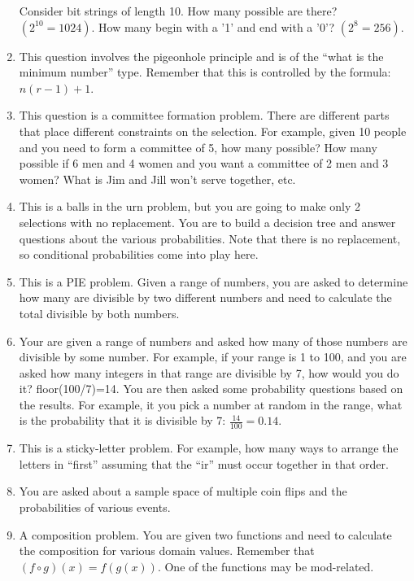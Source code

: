 \documentclass[letterpaper,12pt,fleqn]{article}
\begin{document}
\begin{enumerate}[left=0in]
  Consider bit strings of length 10.  How many possible are there?  \((2^{10}=1024)\).  How many begin with a '1'
  and end with a '0'?  \((2^8=256)\).

\item This question involves the pigeonhole principle and is of the ``what is the minimum number'' type.  Remember
  that this is controlled by the formula: \(n(r-1)+1\).

\item This question is a committee formation problem.  There are different parts that place different
  constraints on the selection.  For example, given 10 people and you need to form a committee of 5, how many
  possible?  How many possible if 6 men and 4 women and you want a committee of 2 men and 3 women?  What is
  Jim and Jill won't serve together, etc.

\item This is a balls in the urn problem, but you are going to make only 2 selections with no replacement.  You are
  to build a decision tree and answer questions about the various probabilities.  Note that there is no replacement,
  so conditional probabilities come into play here.

\item This is a PIE problem.  Given a range of numbers, you are asked to determine how many are divisible by
  two different numbers and need to calculate the total divisible by both numbers.

\item Your are given a range of numbers and asked how many of those numbers are divisible by some number.  For
  example, if your range is 1 to 100, and you are asked how many integers in that range are divisible by 7, how
  would you do it? floor(100/7)=14.  You are then asked some probability questions based on the results.  For
  example, it you pick a number at random in the range, what is the probability that it is divisible by 7:
  \(\frac{14}{100}=0.14\).

\item This is a sticky-letter problem.  For example, how many ways to arrange the letters in ``first'' assuming
  that the ``ir'' must occur together in that order.

\item You are asked about a sample space of multiple coin flips and the probabilities of various events.

\item A composition problem.  You are given two functions and need to calculate the composition for various domain
  values.  Remember that \((f\circ g)(x)=f(g(x))\).  One of the functions may be mod-related.


\end{enumerate}
\end{document}
